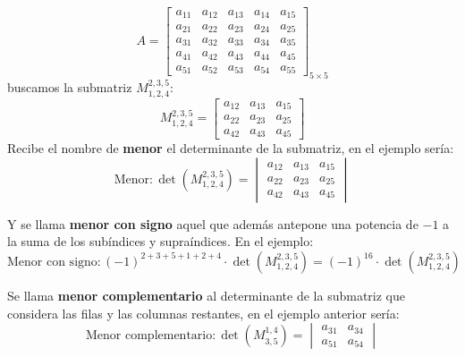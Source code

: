 \[
  A = \begin{bmatrix}
  a_{11} & a_{12} & a_{13} & a_{14} & a_{15}\\
  a_{21} & a_{22} & a_{23} & a_{24} & a_{25}\\
  a_{31} & a_{32} & a_{33} & a_{34} & a_{35}\\
  a_{41} & a_{42} & a_{43} & a_{44} & a_{45}\\
  a_{51} & a_{52} & a_{53} & a_{54} & a_{55}
\end{bmatrix}_{5 \times 5}
\]
buscamos la submatriz \(M^{2,3,5}_{1,2,4}\): 
\[
M^{2,3,5}_{1,2,4} = \begin{bmatrix}
  a_{12} & a_{13} & a_{15} \\
  a_{22} & a_{23} & a_{25} \\
  a_{42} & a_{43} & a_{45} 
\end{bmatrix} 
\]
Recibe el nombre de \textbf{menor} el determinante de la submatriz, en el ejemplo sería:
\[
  \text{Menor}: \det \left(M^{2,3,5}_{1,2,4}\right) = \begin{vmatrix}
    a_{12} & a_{13} & a_{15}\\
    a_{22} & a_{23} & a_{25}\\
    a_{42} & a_{43} & a_{45}
  \end{vmatrix}
\]

Y se llama \textbf{menor con signo} aquel que además antepone una potencia de \(-1\) a la suma de los subíndices y supraíndices. En el ejemplo:
\[
  \text{Menor con signo}: (-1)^{2+3+5+1+2+4}\cdot \det\left(M^{2,3,5}_{1,2,4}\right)=(-1)^{16}\cdot \det \left(M^{2,3,5}_{1,2,4}\right)
\]

Se llama \textbf{menor complementario} al determinante de la submatriz que considera las filas y las columnas restantes, en el ejemplo anterior sería:
\[\text{Menor complementario}:\det\left(M^{1,4}_{3,5}\right) = \begin{vmatrix}
  a_{31} & a_{34}\\
  a_{51} & a_{54}
\end{vmatrix}\]

